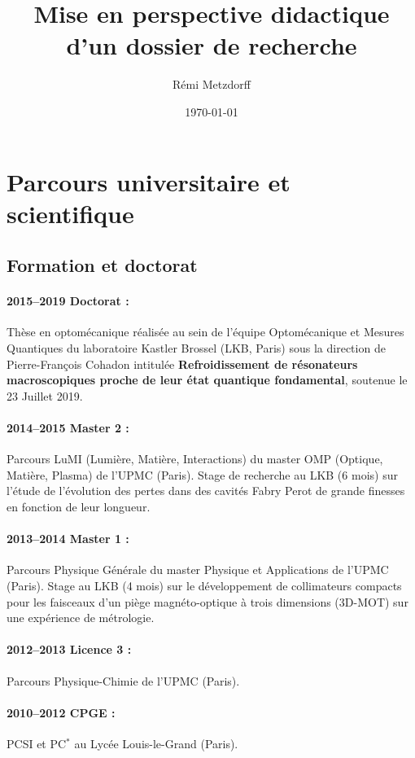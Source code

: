 \documentclass[12pt,a4paper]{article}
\title{Mise en perspective didactique d'un dossier de recherche}
\author{Rémi Metzdorff}
\date{\today}
\begin{document}
\maketitle

\tableofcontents

\section{Parcours universitaire et scientifique}

\subsection{Formation et doctorat}

\paragraph{2015--2019 Doctorat :}
Thèse en optomécanique réalisée au sein de l'équipe Optomécanique et Mesures Quantiques du laboratoire Kastler Brossel (LKB, Paris) sous la direction de Pierre-François Cohadon intitulée \textbf{Refroidissement de résonateurs macroscopiques proche de leur état quantique fondamental}, soutenue le 23 Juillet 2019.

\paragraph{2014--2015 Master 2 :}
Parcours LuMI (Lumière, Matière, Interactions) du master OMP (Optique, Matière, Plasma) de l'UPMC (Paris).
Stage de recherche au LKB (6 mois) sur l'étude de l'évolution des pertes dans des cavités Fabry Perot de grande finesses en fonction de leur longueur.

\paragraph{2013--2014 Master 1 :}
Parcours Physique Générale du master Physique et Applications de l'UPMC (Paris).
Stage au LKB (4 mois) sur le développement de collimateurs compacts pour les faisceaux d'un piège magnéto-optique à trois dimensions (3D-MOT) sur une expérience de métrologie.

\paragraph{2012--2013 Licence 3 :}
Parcours Physique-Chimie de l'UPMC (Paris).

\paragraph{2010--2012 CPGE :} PCSI et PC$^*$ au Lycée Louis-le-Grand (Paris).
\end{document}
